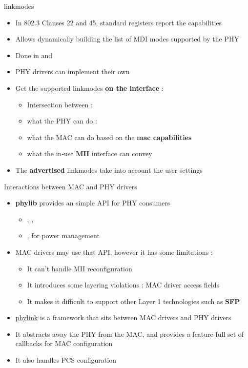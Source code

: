 \begin{frame}{linkmodes}
	\begin{itemize}
		\item In 802.3 Clauses 22 and 45, standard registers report the capabilities
		\item Allows dynamically building the list of MDI modes supported by the PHY
		\item Done in  and 
		\item PHY drivers can implement their own 
		\item Get the supported linkmodes \textbf{on the interface} : 
			\begin{itemize}
				\item Intersection between :
				\item what the PHY can do : 
				\item what the MAC can do based on the \textbf{mac capabilities}
				\item what the in-use \textbf{MII} interface can convey
			\end{itemize}
		\item The \textbf{advertised} linkmodes take into account the user settings
	\end{itemize}
\end{frame}

\begin{frame}{Interactions between MAC and PHY drivers}
	\begin{itemize}
		\item \textbf{phylib} provides an simple API for PHY consumers
			\begin{itemize}
				\item {}, , 
				\item {},  for power management
			\end{itemize}
		\item MAC drivers may use that API, however it has some limitations :
			\begin{itemize}
				\item It can't handle MII reconfiguration
				\item It introduces some layering violations : MAC driver access  fields
				\item It makes it difficult to support other Layer 1 technologies such as \textbf{SFP}
			\end{itemize}
		\item \href{https://elixir.bootlin.com/linux/v6.15.1/source/drivers/net/phy/phylink.c}{phylink} is a framework that sits between MAC drivers and PHY drivers
		\item It abstracts away the PHY from the MAC, and provides a feature-full set of callbacks for MAC configuration
		\item It also handles PCS configuration

	\end{itemize}
\end{frame}

